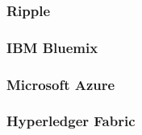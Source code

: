 \subsubsection{Ripple}


\subsubsection{IBM Bluemix}


\subsubsection{Microsoft Azure}


\subsubsection{Hyperledger Fabric}


\newpage